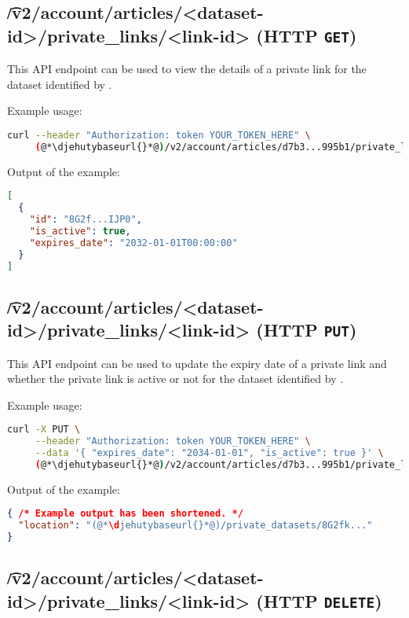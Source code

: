 \subsection{\t{/v2/account/articles/<dataset-id>/private\_links/<link-id>} (HTTP \texttt{GET})}

  This API endpoint can be used to view the details of a private link for
  the dataset identified by .

  Example usage:
\begin{lstlisting}[language=bash]
curl --header "Authorization: token YOUR_TOKEN_HERE" \
     (@*\djehutybaseurl{}*@)/v2/account/articles/d7b3...995b1/private_links/8G2fk... | jq
\end{lstlisting}

  Output of the example:
\begin{lstlisting}[language=JSON]
[
  {
    "id": "8G2f...IJP0",
    "is_active": true,
    "expires_date": "2032-01-01T00:00:00"
  }
]
\end{lstlisting}

\subsection{\t{/v2/account/articles/<dataset-id>/private\_links/<link-id>} (HTTP \texttt{PUT})}

  This API endpoint can be used to update the expiry date of a private link
  and whether the private link is active or not for the dataset identified
  by \code{dataset-id}.

  Example usage:
\begin{lstlisting}[language=bash]
curl -X PUT \
     --header "Authorization: token YOUR_TOKEN_HERE" \
     --data '{ "expires_date": "2034-01-01", "is_active": true }' \
     (@*\djehutybaseurl{}*@)/v2/account/articles/d7b3...995b1/private_links/8G2fk... | jq
\end{lstlisting}

  Output of the example:
\begin{lstlisting}[language=JSON]
{ /* Example output has been shortened. */
  "location": "(@*\djehutybaseurl{}*@)/private_datasets/8G2fk..."
}
\end{lstlisting}

\subsection{\t{/v2/account/articles/<dataset-id>/private\_links/<link-id>} (HTTP \texttt{DELETE})}

